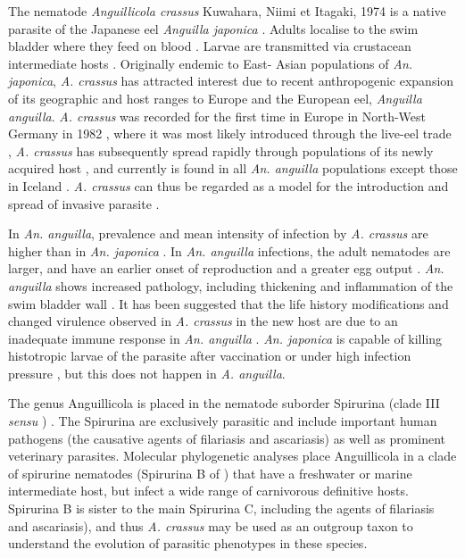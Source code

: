 \documentclass[10pt]{bmc_article}
\newenvironment{bmcformat}{\begin{raggedright}\baselineskip20pt\sloppy\setboolean{publ}{false}}{\end{raggedright}\baselineskip20pt\sloppy}
\begin{document}
\begin{bmcformat}
The nematode \textit{Anguillicola crassus} Kuwahara, Niimi et Itagaki,
1974 is a native parasite of the Japanese eel \textit{Anguilla
  japonica} \cite{kuwahara_Niimi_Itagaki_1974}. Adults localise to the
swim bladder where they feed on blood
\cite{polzer_identification_1993}. Larvae are transmitted via
crustacean intermediate hosts
\cite{de_charleroy_life_1990}. Originally endemic to East- Asian
populations of \textit{An. japonica}, \textit{A. crassus} has
attracted interest due to recent anthropogenic expansion of its
geographic and host ranges to Europe and the European eel,
\textit{Anguilla anguilla}. \textit{A. crassus} was recorded for the
first time in Europe in North-West Germany in 1982
\cite{fischer_teichwirt}, where it was most likely introduced through
the live-eel trade \cite{koops_anguillicola-infestations_1989,
  koie_swimbladder_1991}, \textit{A. crassus} has subsequently spread
rapidly through populations of its newly acquired host
\cite{kirk_impact_2003}, and currently is found in all
\textit{An. anguilla} populations except those in Iceland
\cite{kristmundsson_parasite_2007}. \textit{A. crassus} can thus be
regarded as a model for the introduction and spread of invasive
parasite \cite{taraschewski_hosts_2007}.

In \textit{An. anguilla}, prevalence and mean intensity of infection
by \textit{A. crassus} are higher than in \textit{ An. japonica}
\cite{mnderle_occurrence_2006, lefebvre_anguillicolosis:_2004}. In
\textit{An.  anguilla} infections, the adult nematodes are larger, and
have an earlier onset of reproduction and a greater egg output
\cite{knopf_differences_2004}. \textit{An. anguilla} shows increased
pathology, including thickening and inflammation of the swim bladder
wall \cite{wurtz_tara_2000}. It has been suggested that the life
history modifications and changed virulence observed in
\textit{A. crassus} in the new host are due to an inadequate immune
response in \textit{An. anguilla}
\cite{knopf_swimbladder_2006}. \textit{An. japonica} is capable of
killing histotropic larvae of the parasite after vaccination
\cite{knopf_vaccination_2008} or under high infection pressure
\cite{heitlinger_massive_2009}, but this does not happen in
\textit{A. anguilla}.

The genus Anguillicola is placed in the nematode suborder Spirurina
(clade III \textit{sensu} \cite{blaxter_molecular_1998})
\cite{nadler_molecular_2007, wijov_evolutionary_2006}. The Spirurina
are exclusively parasitic and include important human pathogens (the
causative agents of filariasis and ascariasis) as well as prominent
veterinary parasites. Molecular phylogenetic analyses place
Anguillicola in a clade of spirurine nematodes (Spirurina B of
\cite{dl_py}) that have a freshwater or marine intermediate host, but
infect a wide range of carnivorous definitive hosts. Spirurina B is
sister to the main Spirurina C, including the agents of filariasis and
ascariasis), and thus \textit{A. crassus} may be used as an outgroup
taxon to understand the evolution of parasitic phenotypes in these
species.


\end{bmcformat}
\end{document}
